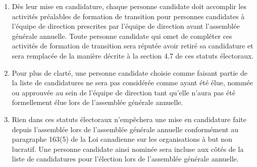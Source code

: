 \begin{enumerate}
  \begin{enumerate}
   \item le poste de cette personne candidate sur la liste de candidatures deviendra vacant ;
   \item le CA ne substituera pas de sa propre autorité une autre personne candidate ;
   \item le CA peut convoquer une autre assemblée de mise en candidature si le temps le permet ; et
   \item si aucune autre assemblée de mise en candidature n'est tenue, le poste peut être pourvu par une mise en candidature depuis l'assemblée lors de l'assemblée générale annuelle.
  \end{enumerate}
 \item Dès leur mise en candidature, chaque personne candidate doit accomplir les activités préalables de formation de transition pour personnes candidates à l'équipe de direction prescrites par l'équipe de direction avant l'assemblée générale annuelle. Toute personne candidate qui omet de compléter ces activités de formation de transition sera réputée avoir retiré sa candidature et sera remplacée de la manière décrite à la section 4.7 de ces statuts électoraux.
 \item Pour plus de clarté, une personne candidate choisie comme faisant partie de la liste de candidatures ne sera pas considérée comme ayant été élue, nommée ou approuvée au sein de l'équipe de direction tant qu'elle n'aura pas été formellement élue lors de l'assemblée générale annuelle.
 \item Rien dans ces statuts électoraux n'empêchera une mise en candidature faite depuis l'assemblée lors de l'assemblée générale annuelle conformément au paragraphe 163(5) de la Loi canadienne sur les organisations à but non lucratif. Une personne candidate ainsi nominée sera incluse aux côtés de la liste de candidatures pour l'élection lors de l'assemblée générale annuelle.
\end{enumerate}
